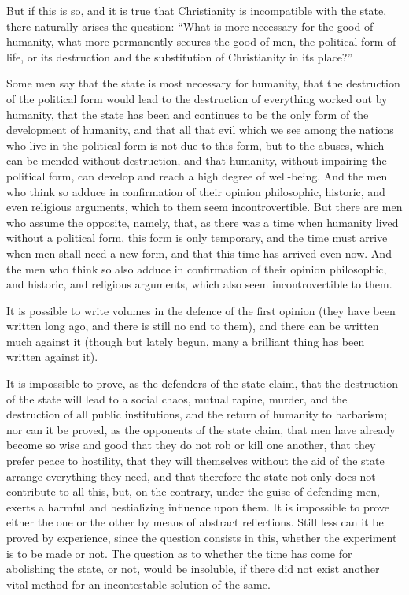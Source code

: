 \documentclass{book}
\begin{document}
But if this is so, and it is true that Christianity is incompatible with the state, there naturally arises the question: “What is more necessary for the good of humanity, what more permanently secures the good of men, the political form of life, or its destruction and the substitution of Christianity in its place?”

Some men say that the state is most necessary for humanity, that the destruction of the political form would lead to the destruction of everything worked out by humanity, that the state has been and continues to be the only form of the development of humanity, and that all that evil which we see among the nations who live in the political form is not due to this form, but to the abuses, which can be mended without destruction, and that humanity, without impairing the political form, can develop and reach a high degree of well-being. And the men who think so adduce in confirmation of their opinion philosophic, historic, and even religious arguments, which to them seem incontrovertible. But there are men who assume the opposite, namely, that, as there was a time when humanity lived without a political form, this form is only temporary, and the time must arrive when men shall need a new form, and that this time has arrived even now. And the men who think so also adduce in confirmation of their opinion philosophic, and historic, and religious arguments, which also seem incontrovertible to them.

It is possible to write volumes in the defence of the first opinion (they have been written long ago, and there is still no end to them), and there can be written much against it (though but lately begun, many a brilliant thing has been written against it).

It is impossible to prove, as the defenders of the state claim, that the destruction of the state will lead to a social chaos, mutual rapine, murder, and the destruction of all public institutions, and the return of humanity to barbarism; nor can it be proved, as the opponents of the state claim, that men have already become so wise and good that they do not rob or kill one another, that they prefer peace to hostility, that they will themselves without the aid of the state arrange everything they need, and that therefore the state not only does not contribute to all this, but, on the contrary, under the guise of defending men, exerts a harmful and bestializing influence upon them. It is impossible to prove either the one or the other by means of abstract reflections. Still less can it be proved by experience, since the question consists in this, whether the experiment is to be made or not. The question as to whether the time has come for abolishing the state, or not, would be insoluble, if there did not exist another vital method for an incontestable solution of the same.
\end{document}
